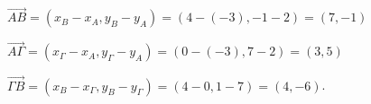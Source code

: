 \begin{alist}
\item $ \overrightarrow{AB}=(x_B-x_A,y_B-y_A)=(4-(-3),-1-2)=(7,-1) $
\item $ \overrightarrow{A\varGamma}=(x_{\varGamma}-x_A,y_{\varGamma}-y_A)=(0-(-3),7-2)=(3,5) $
\item $ \overrightarrow{\varGamma B}=(x_B-x_{\varGamma},y_B-y_{\varGamma})=(4-0,1-7)=(4,-6) $.
\end{alist}
